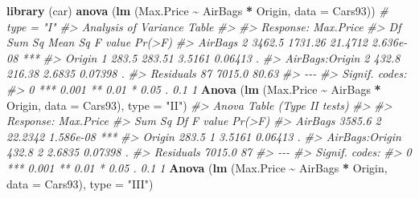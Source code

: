 \documentclass[
]{book}
\newenvironment{Shaded}{\begin{snugshade}}{\end{snugshade}}
\newcommand{\AttributeTok}[1]{\textcolor[rgb]{0.13,0.29,0.53}{#1}}
\newcommand{\CommentTok}[1]{\textcolor[rgb]{0.56,0.35,0.01}{\textit{#1}}}
\newcommand{\FunctionTok}[1]{\textcolor[rgb]{0.13,0.29,0.53}{\textbf{#1}}}
\newcommand{\NormalTok}[1]{#1}
\newcommand{\SpecialCharTok}[1]{\textcolor[rgb]{0.81,0.36,0.00}{\textbf{#1}}}
\newcommand{\StringTok}[1]{\textcolor[rgb]{0.31,0.60,0.02}{#1}}
\begin{document}
\begin{Shaded}
\begin{Highlighting}[]
\FunctionTok{library}\NormalTok{ (car)}
\FunctionTok{anova}\NormalTok{ (}\FunctionTok{lm}\NormalTok{ (Max.Price }\SpecialCharTok{\textasciitilde{}}\NormalTok{ AirBags }\SpecialCharTok{*}\NormalTok{ Origin, }\AttributeTok{data =}\NormalTok{ Cars93))   }\CommentTok{\# type = "I"}
\CommentTok{\#\textgreater{} Analysis of Variance Table}
\CommentTok{\#\textgreater{} }
\CommentTok{\#\textgreater{} Response: Max.Price}
\CommentTok{\#\textgreater{}                Df Sum Sq Mean Sq F value    Pr(\textgreater{}F)    }
\CommentTok{\#\textgreater{} AirBags         2 3462.5 1731.26 21.4712 2.636e{-}08 ***}
\CommentTok{\#\textgreater{} Origin          1  283.5  283.51  3.5161   0.06413 .  }
\CommentTok{\#\textgreater{} AirBags:Origin  2  432.8  216.38  2.6835   0.07398 .  }
\CommentTok{\#\textgreater{} Residuals      87 7015.0   80.63                      }
\CommentTok{\#\textgreater{} {-}{-}{-}}
\CommentTok{\#\textgreater{} Signif. codes:  }
\CommentTok{\#\textgreater{} 0 \textquotesingle{}***\textquotesingle{} 0.001 \textquotesingle{}**\textquotesingle{} 0.01 \textquotesingle{}*\textquotesingle{} 0.05 \textquotesingle{}.\textquotesingle{} 0.1 \textquotesingle{} \textquotesingle{} 1}
\FunctionTok{Anova}\NormalTok{ (}\FunctionTok{lm}\NormalTok{ (Max.Price }\SpecialCharTok{\textasciitilde{}}\NormalTok{ AirBags }\SpecialCharTok{*}\NormalTok{ Origin, }\AttributeTok{data =}\NormalTok{ Cars93), }\AttributeTok{type =} \StringTok{"II"}\NormalTok{)}
\CommentTok{\#\textgreater{} Anova Table (Type II tests)}
\CommentTok{\#\textgreater{} }
\CommentTok{\#\textgreater{} Response: Max.Price}
\CommentTok{\#\textgreater{}                Sum Sq Df F value    Pr(\textgreater{}F)    }
\CommentTok{\#\textgreater{} AirBags        3585.6  2 22.2342 1.586e{-}08 ***}
\CommentTok{\#\textgreater{} Origin          283.5  1  3.5161   0.06413 .  }
\CommentTok{\#\textgreater{} AirBags:Origin  432.8  2  2.6835   0.07398 .  }
\CommentTok{\#\textgreater{} Residuals      7015.0 87                      }
\CommentTok{\#\textgreater{} {-}{-}{-}}
\CommentTok{\#\textgreater{} Signif. codes:  }
\CommentTok{\#\textgreater{} 0 \textquotesingle{}***\textquotesingle{} 0.001 \textquotesingle{}**\textquotesingle{} 0.01 \textquotesingle{}*\textquotesingle{} 0.05 \textquotesingle{}.\textquotesingle{} 0.1 \textquotesingle{} \textquotesingle{} 1}
\FunctionTok{Anova}\NormalTok{ (}\FunctionTok{lm}\NormalTok{ (Max.Price }\SpecialCharTok{\textasciitilde{}}\NormalTok{ AirBags }\SpecialCharTok{*}\NormalTok{ Origin, }\AttributeTok{data =}\NormalTok{ Cars93), }\AttributeTok{type =} \StringTok{"III"}\NormalTok{)}

\end{Highlighting}
\end{Shaded}
\end{document}
